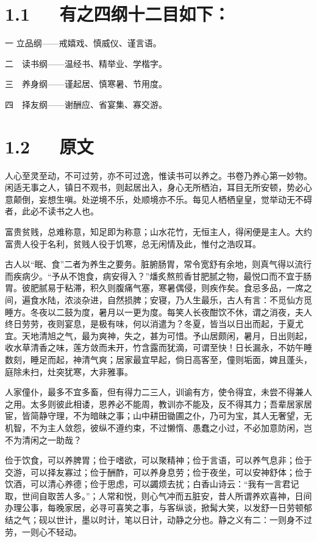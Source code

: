 \documentclass[letterpaper,12pt,english]{sphinxmanual}
\begin{document}
\section{1.1   有之四纲十二目如下：}
\label{\detokenize{p00_u5176_u5b83/_u5f20_u82f1-_u806a_u8bad_u658b_u8bed:id3}}
一 立品纲——戒嬉戏、慎威仪、谨言语。

二　读书纲——温经书、精举业、学楷字。

三　养身纲——谨起居、慎寒暑、节用度。

四　择友纲——谢酬应、省宴集、寡交游。


\section{1.2   原文}
\label{\detokenize{p00_u5176_u5b83/_u5f20_u82f1-_u806a_u8bad_u658b_u8bed:id4}}
人心至灵至动，不可过劳，亦不可过逸，惟读书可以养之。书卷乃养心第一妙物。闲适无事之人，镇日不观书，则起居出入，身心无所栖泊，耳目无所安顿，势必心意颠倒，妄想生嗔。处逆境不乐，处顺境亦不乐。每见人栖栖皇皇，觉举动无不碍者，此必不读书之人也。

富贵贫贱，总难称意，知足即为称意；山水花竹，无恒主人，得闲便是主人。大约富贵人役于名利，贫贱人役于饥寒，总无闲情及此，惟付之浩叹耳。

古人以“眠、食”二者为养生之要务。脏腑肠胃，常令宽舒有余地，则真气得以流行而疾病少。“予从不饱食，病安得入？”燔炙熬煎香甘肥腻之物，最悦口而不宜于肠胃。彼肥腻易于粘滞，积久则腹痛气塞，寒暑偶侵，则疾作矣。食忌多品，一席之间，遍食水陆，浓淡杂进，自然损脾；安寝，乃人生最乐，古人有言：不觅仙方觅睡方。冬夜以二鼓为度，暑月以一更为度。每笑人长夜酣饮不休，谓之消夜，夫人终日劳劳，夜则宴息，是极有味，何以消遣为？冬夏，皆当以日出而起，于夏尤宜。天地清旭之气，最为爽神，失之，甚为可惜。予山居颇闲，暑月，日出则起，收水草清香之味，莲方敛而未开，竹含露而犹滴，可谓至快！日长漏永，不妨午睡数刻，睡足而起，神清气爽；居家最宜早起，倘日高客至，僮则垢面，婢且蓬头，庭除未扫，灶突犹寒，大非雅事。

人家僮仆，最多不宜多畜，但有得力二三人，训谕有方，使令得宜，未尝不得兼人之用。太多则彼此相诿，恩养必不能周，教训亦不能及，反不得其力；吾辈居家居宦，皆简静守理，不为暗昧之事；山中耕田锄圃之仆，乃可为宝，其人无奢望，无机智，不为主人敛怨，彼纵不遵约束，不过懒惰、愚蠢之小过，不必加意防闲，岂不为清闲之一助哉？

俭于饮食，可以养脾胃；俭于嗜欲，可以聚精神；俭于言语，可以养气息非；俭于交游，可以择友寡过；俭于酬酢，可以养身息劳；俭于夜坐，可以安神舒体；俭于饮酒，可以清心养德；俭于思虑，可以蠲烦去扰；白香山诗云：“我有一言君记取，世间自取苦人多。”；人常和悦，则心气冲而五脏安，昔人所谓养欢喜神，日间办理公事，每晚家居，必寻可喜笑之事，与客纵谈，掀髯大笑，以发舒一日劳顿郁结之气；砚以世计，墨以时计，笔以日计，动静之分也。静之义有二：一则身不过劳，一则心不轻动。
\end{document}
